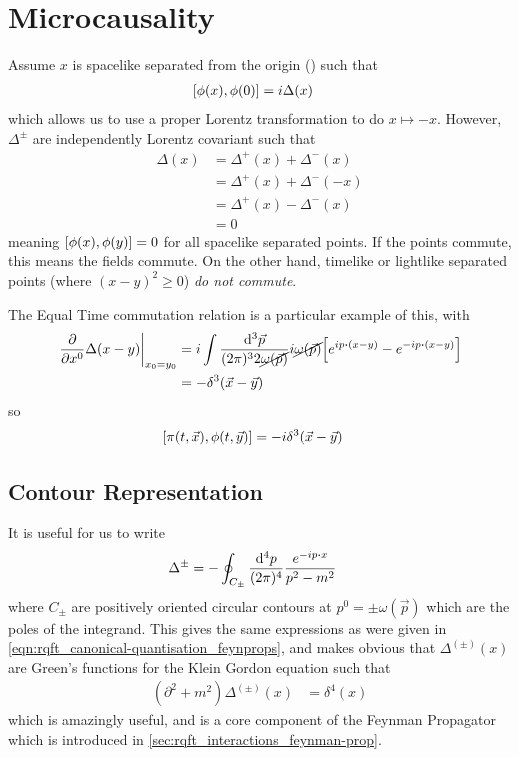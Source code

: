 \documentclass[notes.tex]{subfiles}
\begin{document}
\section{Microcausality}
Assume $x$ is spacelike separated from the origin () such that
\begin{align*}
    \commutator{\phi(x)}{\phi(0)} &= i\Delta(x)
\end{align*}
which allows us to use a proper Lorentz transformation to do $x\mapsto-x$.
However, $\Delta^\pm$ are independently Lorentz covariant such that
\begin{align*}
    \Delta(x) &= \Delta^+(x) + \Delta^-(x)\\
    &= \Delta^+(x) + \Delta^-(-x)\\
    &= \Delta^+(x) - \Delta^-(x)\\
    &= 0
\end{align*}
meaning $\commutator{\phi(x)}{\phi(y)} = 0$ for all spacelike separated points.
If the points commute, this means the fields commute. On the other hand, timelike or lightlike separated points (where $(x-y)^2 \geq 0$) \emph{do not commute}.

The Equal Time commutation relation is a particular example of this, with
\begin{align*}
    \eval{\pdv{x^0}\Delta(x-y)}_{x_0 = y_0} &= i\int \frac{\dd[3]{\vec{p}}}{(2\pi)^3 2 \cancel{\omega(\vec{p})}} i \cancel{\omega(\vec{p})} \qty[e^{ip\vdot(x-y)} - e^{-ip\vdot(x-y)}]\\
    &= -\delta^3(\vec{x} - \vec{y})
\end{align*}
so\begin{align*}
    \commutator{\pi(t, \vec{x})}{\phi(t, \vec{y})} &= -i\delta^3(\vec{x} - \vec{y})
\end{align*}

\subsection{Contour Representation}
It is useful for us to write 
\begin{align*}
    \Delta^\pm &= - \oint_{C_\pm} \frac{\dd[4]{p}}{(2\pi)^4}\frac{e^{-ip\vdot{}x}}{p^2 - m^2}
\end{align*}
where $C_\pm$ are positively oriented circular contours at $p^0=\pm \omega(\vec{p})$ which are the poles of the integrand. This gives the same expressions as were given in \autoref{eqn:rqft_canonical-quantisation_feynprops}, and makes obvious that $\Delta^{(\pm)}(x)$ are Green's functions for the Klein Gordon equation such that
\begin{align*}
    (\partial^2 + m^2)\Delta^{(\pm)}(x) &= \delta^4(x)
\end{align*}
which is amazingly useful, and is a core component of the Feynman Propagator which is introduced in \autoref{sec:rqft_interactions_feynman-prop}.
\end{document}

